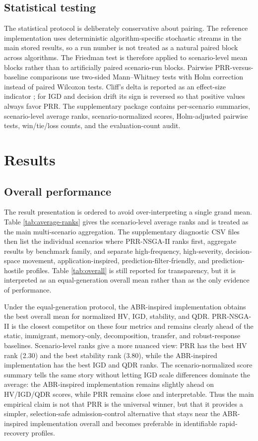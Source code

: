 \documentclass[1p,times]{elsarticle}
\begin{document}
\subsection{Statistical testing}
The statistical protocol is deliberately conservative about pairing. The reference implementation uses deterministic algorithm-specific stochastic streams in the main stored results, so a run number is not treated as a natural paired block across algorithms. The Friedman test is therefore applied to scenario-level mean blocks rather than to artificially paired scenario-run blocks. Pairwise PRR-versus-baseline comparisons use two-sided Mann--Whitney tests with Holm correction instead of paired Wilcoxon tests. Cliff's delta is reported as an effect-size indicator \cite{sawilowsky2009}; for IGD and decision drift its sign is reversed so that positive values always favor PRR. The supplementary package contains per-scenario summaries, scenario-level average ranks, scenario-normalized scores, Holm-adjusted pairwise tests, win/tie/loss counts, and the evaluation-count audit.

\section{Results}
\subsection{Overall performance}
The result presentation is ordered to avoid over-interpreting a single grand mean. Table \ref{tab:average-ranks} gives the scenario-level average ranks and is treated as the main multi-scenario aggregation. The supplementary diagnostic CSV files then list the individual scenarios where PRR-NSGA-II ranks first, aggregate results by benchmark family, and separate high-frequency, high-severity, decision-space movement, application-inspired, prediction-filter-friendly, and prediction-hostile profiles. Table \ref{tab:overall} is still reported for transparency, but it is interpreted as an equal-generation overall mean rather than as the only evidence of performance.

Under the equal-generation protocol, the ABR-inspired implementation obtains the best overall mean for normalized HV, IGD, stability, and QDR. PRR-NSGA-II is the closest competitor on these four metrics and remains clearly ahead of the static, immigrant, memory-only, decomposition, transfer, and robust-response baselines. Scenario-level ranks give a more nuanced view: PRR has the best HV rank (2.30) and the best stability rank (3.80), while the ABR-inspired implementation has the best IGD and QDR ranks. The scenario-normalized score summary tells the same story without letting IGD scale differences dominate the average: the ABR-inspired implementation remains slightly ahead on HV/IGD/QDR scores, while PRR remains close and interpretable. Thus the main empirical claim is not that PRR is the universal winner, but that it provides a simpler, selection-safe admission-control alternative that stays near the ABR-inspired implementation overall and becomes preferable in identifiable rapid-recovery profiles.
\end{document}
